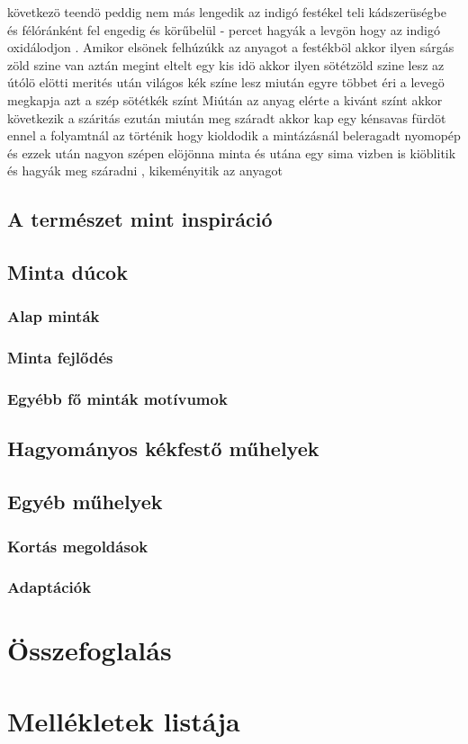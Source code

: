 \documentclass[fontsize=12pt, appendixprefix=true]{scrreprt}
\begin{document}
következö teendö peddig nem  más  lengedik  az indigó festékel teli kádszerüségbe és  félóránként fel engedig és körűbelül - percet hagyák a levgön hogy az indigó oxidálodjon .
Amikor elsönek felhúzúkk az anyagot a festékböl akkor ilyen sárgás zöld szine van aztán megint eltelt egy kis idö akkor ilyen sötétzöld szine lesz az útólö elötti merités után világos kék színe lesz 
miután egyre többet éri a levegö  megkapja azt a szép sötétkék színt 
Miútán az anyag elérte a kivánt színt akkor következik a száritás ezután miután meg száradt akkor kap egy kénsavas fürdöt ennel a folyamtnál az történik hogy kioldodik a mintázásnál beleragadt nyomopép és ezzek után nagyon szépen elöjönna minta és utána egy sima vizben is kiöblitik és hagyák meg száradni , kikeményitik az anyagot 
















\section{A természet mint inspiráció}
\section{Minta dúcok}


\subsection{Alap minták}
\subsection{Minta fejlődés}
\subsection{Egyébb fő minták motívumok}
\section{Hagyományos kékfestő műhelyek}
\section{Egyéb műhelyek}
\subsection{Kortás megoldások}
\subsection{Adaptációk}

\chapter{Összefoglalás} 


\printbibliography
\renewcommand{\appendixname}{Függelék}  %
\appendix
\chapter{Mellékletek listája}
\end{document}
